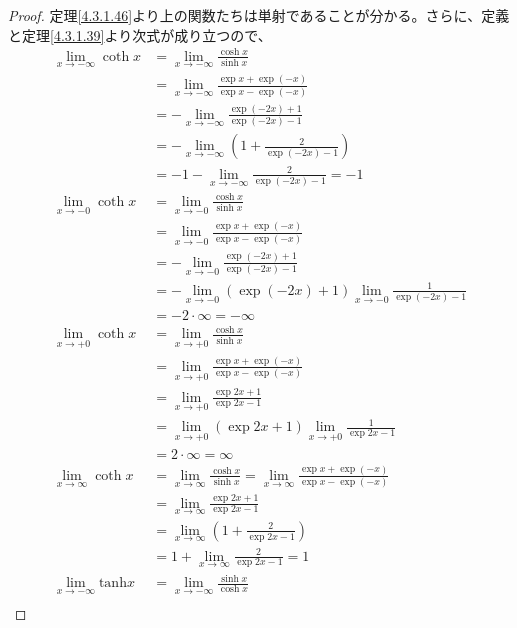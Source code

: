 \documentclass[dvipdfmx]{jsarticle}
\begin{document}
\begin{proof} 定理\ref{4.3.1.46}より上の関数たちは単射であることが分かる。さらに、定義と定理\ref{4.3.1.39}より次式が成り立つので、
\begin{align*}
\lim_{x \rightarrow - \infty}{\coth x} &= \lim_{x \rightarrow - \infty}\frac{\cosh x}{\sinh x}\\
&= \lim_{x \rightarrow - \infty}\frac{\exp x + \exp( - x)}{\exp x - \exp( - x)}\\
&= - \lim_{x \rightarrow - \infty}\frac{\exp( - 2x) + 1}{\exp( - 2x) - 1}\\
&= - \lim_{x \rightarrow - \infty}\left( 1 + \frac{2}{\exp( - 2x) - 1} \right)\\
&= - 1 - \lim_{x \rightarrow - \infty}\frac{2}{\exp( - 2x) - 1} = - 1\\
\lim_{x \rightarrow - 0}{\coth x} &= \lim_{x \rightarrow - 0}\frac{\cosh x}{\sinh x}\\
&= \lim_{x \rightarrow - 0}\frac{\exp x + \exp( - x)}{\exp x - \exp( - x)}\\
&= - \lim_{x \rightarrow - 0}\frac{\exp( - 2x) + 1}{\exp( - 2x) - 1}\\
&= - \lim_{x \rightarrow - 0}\left( \exp( - 2x) + 1 \right)\lim_{x \rightarrow - 0}\frac{1}{\exp( - 2x) - 1}\\
&= - 2 \cdot \infty = - \infty\\
\lim_{x \rightarrow + 0}{\coth x} &= \lim_{x \rightarrow + 0}\frac{\cosh x}{\sinh x}\\
&= \lim_{x \rightarrow + 0}\frac{\exp x + \exp( - x)}{\exp x - \exp( - x)}\\
&= \lim_{x \rightarrow + 0}\frac{\exp{2x} + 1}{\exp{2x} - 1}\\
&= \lim_{x \rightarrow + 0}\left( \exp{2x} + 1 \right)\lim_{x \rightarrow + 0}\frac{1}{\exp{2x} - 1}\\
&= 2 \cdot \infty = \infty\\
\lim_{x \rightarrow \infty}{\coth x} &= \lim_{x \rightarrow \infty}\frac{\cosh x}{\sinh x} = \lim_{x \rightarrow \infty}\frac{\exp x + \exp( - x)}{\exp x - \exp( - x)}\\
&= \lim_{x \rightarrow \infty}\frac{\exp{2x} + 1}{\exp{2x} - 1}\\
&= \lim_{x \rightarrow \infty}\left( 1 + \frac{2}{\exp{2x} - 1} \right)\\
&= 1 + \lim_{x \rightarrow \infty}\frac{2}{\exp{2x} - 1} = 1\\
\lim_{x \rightarrow - \infty}{\mathrm{tanh} x} &= \lim_{x \rightarrow - \infty}\frac{\sinh x}{\cosh x}\\

\end{align*}
\end{proof}
\end{document}
